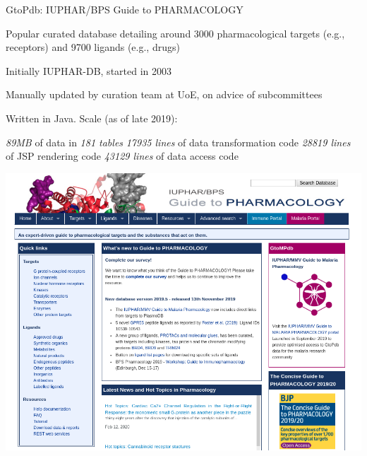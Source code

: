 \documentclass[11.5pt, aspectratio=169]{beamer}
\begin{document}
\begin{frame}{GtoPdb: IUPHAR/BPS Guide to PHARMACOLOGY}
  \begin{minipage}{0.525\textwidth}
    \begin{fullpageitemize}
    \item Popular curated database detailing around 3000 pharmacological targets (e.g.,
      receptors) and 9700 ligands (e.g., drugs)
      \vspace{1em}
    \item Initially IUPHAR-DB, started in 2003
      \vspace{1em}
    \item Manually updated by curation team at
      UoE, on advice of subcommittees
      \vspace{1em}
    \item Written in Java. Scale (as of late 2019):
      \begin{itemize}
        \itemR \emph{89MB} of data in \emph{181 tables}
        \itemR \emph{17935 lines} of data transformation code
        \itemR \emph{28819 lines} of JSP rendering code
        \itemR \emph{43129 lines} of data access code
      \end{itemize}
    \end{fullpageitemize}
  \end{minipage}
  \hfill
  \begin{minipage}{0.4\textwidth}
    \includegraphics[width=\textwidth]{images/gtopdb-screenshot.png}
  \end{minipage}

\end{frame}
\end{document}
